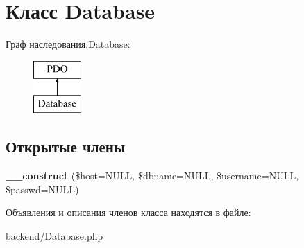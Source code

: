 \hypertarget{classDatabase}{}\section{Класс Database}
\label{classDatabase}
Граф наследования\+:Database\+:\begin{figure}[H]
\begin{center}
\leavevmode
\includegraphics[height=2.000000cm]{classDatabase}
\end{center}
\end{figure}
\subsection*{Открытые члены}
\begin{DoxyCompactItemize}
\item 
\hypertarget{classDatabase_ab2bc6b3afffba0473e1f9026a2af99fb}{}{\bfseries \+\_\+\+\_\+construct} (\$host=N\+U\+L\+L, \$dbname=N\+U\+L\+L, \$username=N\+U\+L\+L, \$passwd=N\+U\+L\+L)\label{classDatabase_ab2bc6b3afffba0473e1f9026a2af99fb}

\end{DoxyCompactItemize}


Объявления и описания членов класса находятся в файле\+:\begin{DoxyCompactItemize}
\item 
backend/Database.\+php\end{DoxyCompactItemize}

